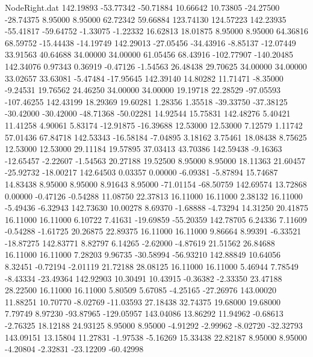 \begin{filecontents}{NodeRight.dat}
 142.19893  -53.77342  -50.71884    10.66642   10.73805  -24.27500  -28.74375    8.95000    8.95000   62.72342   59.66884  123.74130  124.57223
 142.23935  -55.41817  -59.64752    -1.33075   -1.22332   16.62813   18.01875    8.95000    8.95000   64.36816   68.59752  -15.44438  -14.19749
 142.29013  -27.05456  -34.43916    -8.85137  -12.07449   33.91563   40.64688   34.00000   34.00000   61.05456   68.43916 -102.77907 -140.20485
 142.34076    0.97343    0.36919    -0.47126   -1.54563   26.48438   29.70625   34.00000   34.00000   33.02657   33.63081   -5.47484  -17.95645
 142.39140   14.80282   11.71471    -8.35000   -9.24531   19.76562   24.46250   34.00000   34.00000   19.19718   22.28529  -97.05593 -107.46255
 142.43199   18.29369   19.60281     1.28356    1.35518  -39.33750  -37.38125  -30.42000  -30.42000  -48.71368  -50.02281   14.92544   15.75831
 142.48276    5.40421   11.41258     4.90061    5.83174  -12.91875  -16.39688   12.53000   12.53000    7.12579    1.11742   57.01436   67.84718
 142.53343  -16.58184   -7.04895     3.18162    3.75461   18.08438    8.75625   12.53000   12.53000   29.11184   19.57895   37.03413   43.70386
 142.59438   -9.16363  -12.65457    -2.22607   -1.54563   20.27188   19.52500    8.95000    8.95000   18.11363   21.60457  -25.92732  -18.00217
 142.64503    0.03357    0.00000    -6.09381   -5.87894   15.74687   14.83438    8.95000    8.95000    8.91643    8.95000  -71.01154  -68.50759
 142.69574   13.72868    0.00000    -0.47126   -0.54288   11.08750   22.37813   16.11000   16.11000    2.38132   16.11000   -5.49436   -6.32943
 142.73630   10.00278    8.69370    -1.68888   -4.73294   14.31250   20.41875   16.11000   16.11000    6.10722    7.41631  -19.69859  -55.20359
 142.78705    6.24336    7.11609    -0.54288   -1.61725   20.26875   22.89375   16.11000   16.11000    9.86664    8.99391   -6.33521  -18.87275
 142.83771    8.82797    6.14265    -2.62000   -4.87619   21.51562   26.84688   16.11000   16.11000    7.28203    9.96735  -30.58994  -56.93210
 142.88849   10.64056    8.32451    -0.72194   -2.01119   21.72188   28.08125   16.11000   16.11000    5.46944    7.78549   -8.43334  -23.49364
 142.92903   10.30491   10.43915    -0.36382   -2.33350   23.47188   28.22500   16.11000   16.11000    5.80509    5.67085   -4.25165  -27.26976
 143.00020   11.88251   10.70770    -8.02769  -11.03593   27.18438   32.74375   19.68000   19.68000    7.79749    8.97230  -93.87965 -129.05957
 143.04086   13.86292   11.94962    -0.68613   -2.76325   18.12188   24.93125    8.95000    8.95000   -4.91292   -2.99962   -8.02720  -32.32793
 143.09151   13.15804   11.27831    -1.97538   -5.16269   15.33438   22.82187    8.95000    8.95000   -4.20804   -2.32831  -23.12209  -60.42998

\end{filecontents}
